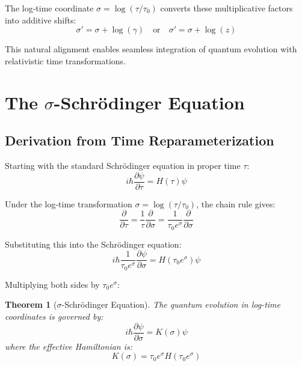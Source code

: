 \documentclass[11pt,a4paper]{article}
\newtheorem{theorem}{Theorem}[section]
\begin{document}
The log-time coordinate $\sigma = \log(\tau/\tau_0)$ converts these multiplicative factors into additive shifts:
\begin{equation}
\sigma' = \sigma + \log(\gamma) \quad \text{or} \quad \sigma' = \sigma + \log(z)
\end{equation}

This natural alignment enables seamless integration of quantum evolution with relativistic time transformations.

\section{The $\sigma$-Schrödinger Equation}

\subsection{Derivation from Time Reparameterization}

Starting with the standard Schrödinger equation in proper time $\tau$:
\begin{equation}
i\hbar \frac{\partial \psi}{\partial \tau} = H(\tau) \psi
\end{equation}

Under the log-time transformation $\sigma = \log(\tau/\tau_0)$, the chain rule gives:
\begin{equation}
\frac{\partial}{\partial \tau} = \frac{1}{\tau} \frac{\partial}{\partial \sigma} = \frac{1}{\tau_0 e^{\sigma}} \frac{\partial}{\partial \sigma}
\end{equation}

Substituting this into the Schrödinger equation:
\begin{equation}
i\hbar \frac{1}{\tau_0 e^{\sigma}} \frac{\partial \psi}{\partial \sigma} = H(\tau_0 e^{\sigma}) \psi
\end{equation}

Multiplying both sides by $\tau_0 e^{\sigma}$:

\begin{theorem}[$\sigma$-Schrödinger Equation]
The quantum evolution in log-time coordinates is governed by:
\begin{equation}
i\hbar \frac{\partial \psi}{\partial \sigma} = K(\sigma) \psi
\end{equation}
where the effective Hamiltonian is:
\begin{equation}
K(\sigma) = \tau_0 e^{\sigma} H(\tau_0 e^{\sigma})
\end{equation}
\end{theorem}
\end{document}
